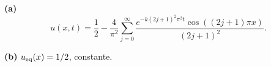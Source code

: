 \noindent\textbf{(a)} \[u(x,t)=\frac12-\frac4{\pi^2}\sum_{j=0}^{\infty}
\frac{e^{-k(2j+1)^2\pi^2t}\cos((2j+1)\pi x)}{(2j+1)^2}.\]

\noindent\textbf{(b)} \(u_{\rm eq}(x)=1/2\), constante.
